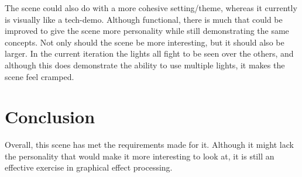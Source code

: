 \documentclass[10pt, a4paper]{article}
\begin{document}
	The scene could also do with a more cohesive setting/theme, whereas it currently is visually like a tech-demo.  Although functional, there is much that could be improved to give the scene more personality while still demonstrating the same concepts.  Not only should the scene be more interesting, but it should also be larger.  In the current iteration the lights all fight to be seen over the others, and although this does demonstrate the ability to use multiple lights, it makes the scene feel cramped.
	
	
	\section{Conclusion}	
	Overall, this scene has met the requirements made for it.  Although it might lack the personality that would make it more interesting to look at, it is still an effective exercise in graphical effect processing.  
	
%	
%	
		
\end{document}
